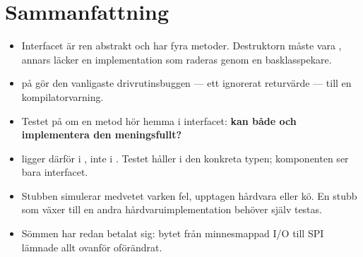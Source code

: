 \section*{Sammanfattning}

\begin{itemize}
  \item Interfacet är ren abstrakt och har fyra metoder. Destruktorn måste vara ,
    annars läcker en implementation som raderas genom en basklasspekare.
  \item \code{[[nodiscard]]} på  gör den vanligaste drivrutinsbuggen --- ett ignorerat
    returvärde --- till en kompilatorvarning.
  \item Testet på om en metod hör hemma i interfacet: \textbf{kan både  och 
    implementera den meningsfullt?}
  \item {} ligger därför i , inte i . Testet håller i den
    konkreta typen; komponenten ser bara interfacet.
  \item Stubben simulerar medvetet varken fel, upptagen hårdvara eller kö. En stubb som växer till
    en andra hårdvaruimplementation behöver själv testas.
  \item Sömmen har redan betalat sig: bytet från minnesmappad I/O till SPI lämnade allt ovanför
     oförändrat.
\end{itemize}
